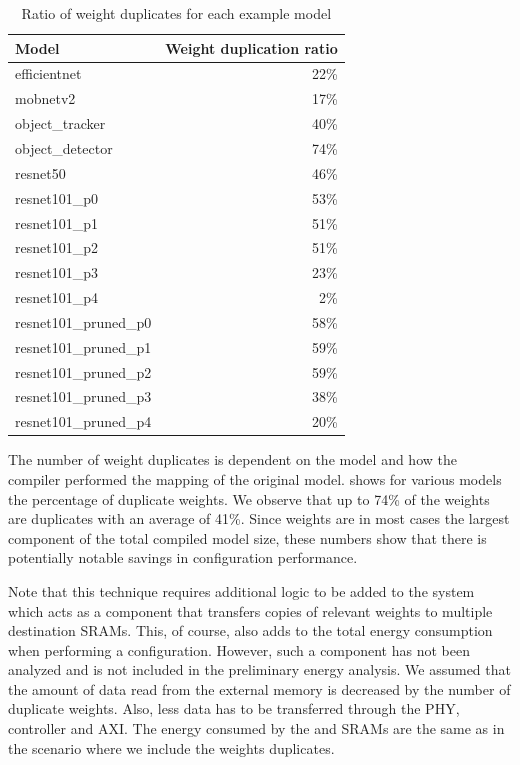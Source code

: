 \begin{table}[hbtp]
\centering
\begin{tabular}{@{}lr@{}}
\toprule
\textbf{Model}          & \textbf{Weight duplication ratio} \\ \midrule
efficientnet            & 22\%                              \\
mobnetv2                & 17\%                              \\
object\_tracker         & 40\%                              \\
object\_detector        & 74\%                              \\
resnet50                & 46\%                              \\
resnet101\_p0           & 53\%                              \\
resnet101\_p1           & 51\%                              \\
resnet101\_p2           & 51\%                              \\
resnet101\_p3           & 23\%                              \\
resnet101\_p4           & 2\%                               \\
resnet101\_pruned\_p0   & 58\%                              \\
resnet101\_pruned\_p1   & 59\%                              \\
resnet101\_pruned\_p2   & 59\%                              \\
resnet101\_pruned\_p3   & 38\%                              \\
resnet101\_pruned\_p4   & 20\%                              \\ \bottomrule
\end{tabular}
\caption{Ratio of weight duplicates for each example model}
\label{tab:example_models_duplicate_weights}
\end{table}

The number of weight duplicates is dependent on the model and how the compiler performed the mapping of the original model.
 shows for various models the percentage of duplicate weights.
We observe that up to 74\% of the weights are duplicates with an average of 41\%.
Since weights are in most cases the largest component of the total compiled model size, these numbers show that there is potentially notable savings in configuration performance.

Note that this technique requires additional logic to be added to the system which acts as a component that transfers copies of relevant weights to multiple destination SRAMs.
This, of course, also adds to the total energy consumption when performing a configuration.
However, such a component has not been analyzed and is not included in the preliminary energy analysis. 
We assumed that the amount of data read from the external memory is decreased by the number of duplicate weights.
Also, less data has to be transferred through the PHY, controller and AXI.
The energy consumed by the \confignoc{} and SRAMs are the same as in the scenario where we include the weights duplicates.

